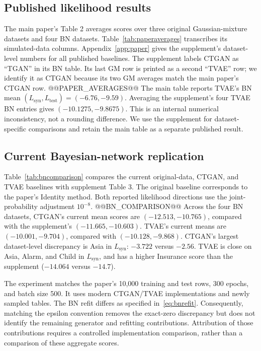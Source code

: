 \documentclass[11pt,letterpaper]{article}
\newcommand{\Lsyn}{L_{\mathrm{syn}}}
\newcommand{\Ltest}{L_{\mathrm{test}}}
\begin{document}
\subsection{Published likelihood results}
The main paper's Table 2 averages scores over three original Gaussian-mixture datasets and four BN datasets. Table~\ref{tab:paperaverages} transcribes its simulated-data columns. Appendix~\ref{app:paper} gives the supplement's dataset-level numbers for all published baselines. The supplement labels CTGAN as ``TGAN'' in its BN table. Its last GM row is printed as a second ``TVAE'' row; we identify it as CTGAN because its two GM averages match the main paper's CTGAN row.
@@PAPER_AVERAGES@@
The main table reports TVAE's BN mean $(\Lsyn,\Ltest)=(-6.76,-9.59)$. Averaging the supplement's four TVAE BN entries gives $(-10.1275,-9.8675)$. This is an internal numerical inconsistency, not a rounding difference. We use the supplement for dataset-specific comparisons and retain the main table as a separate published result.

\subsection{Current Bayesian-network replication}
Table~\ref{tab:bncomparison} compares the current original-data, CTGAN, and TVAE baselines with supplement Table 3. The original baseline corresponds to the paper's Identity method. Both reported likelihood directions use the joint-probability adjustment $10^{-8}$.
@@BN_COMPARISON@@
Across the four BN datasets, CTGAN's current mean scores are $(-12.513,-10.765)$, compared with the supplement's $(-11.665,-10.603)$. TVAE's current means are $(-10.001,-9.704)$, compared with $(-10.128,-9.868)$. CTGAN's largest dataset-level discrepancy is Asia in $\Lsyn$: $-3.722$ versus $-2.56$. TVAE is close on Asia, Alarm, and Child in $\Lsyn$, and has a higher Insurance score than the supplement ($-14.064$ versus $-14.7$).

The experiment matches the paper's 10,000 training and test rows, 300 epochs, and batch size 500. It uses modern CTGAN/TVAE implementations and newly sampled tables. The BN refit differs as specified in~\eqref{eq:bnrefit}. Consequently, matching the epsilon convention removes the exact-zero discrepancy but does not identify the remaining generator and refitting contributions. Attribution of those contributions requires a controlled implementation comparison, rather than a comparison of these aggregate scores.
\end{document}
